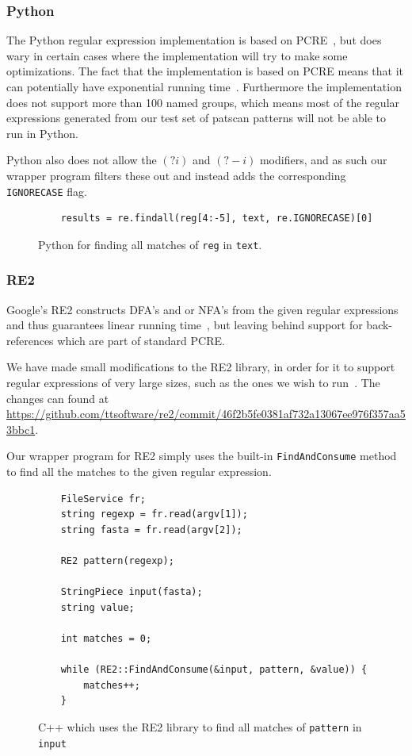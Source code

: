 \documentclass[12pt]{article}
\theoremstyle{definition}
\begin{document}
\subsubsection{Python}

The Python regular expression implementation is based on PCRE~\cite{pcre}, but does wary in certain cases where the implementation will try to make some optimizations. The fact that the implementation is based on PCRE means that it can potentially have exponential running time~\cite{pcre-running-time}. Furthermore the implementation does not support more than 100 named groups, which means most of the regular expressions generated from our test set of patscan patterns will not be able to run in Python.

Python also does not allow the $(?i)$ and $(?-i)$ modifiers, and as such our wrapper program filters these out and instead adds the corresponding \texttt{IGNORECASE} flag.

\begin{figure}[H]
	\begin{lstlisting}
	results = re.findall(reg[4:-5], text, re.IGNORECASE)[0]
	\end{lstlisting}
	\caption{Python for finding all matches of \texttt{reg} in \texttt{text}.}
\end{figure}

\subsubsection{RE2}

Google's RE2 constructs DFA's and or NFA's from the given regular expressions and thus guarantees linear running time~\cite{pcre-running-time}, but leaving behind support for back-references which are part of standard PCRE.

We have made small modifications to the RE2 library, in order for it to support regular expressions of very large sizes, such as the ones we wish to run~\cite{re2}. The changes can found at \small \url{https://github.com/ttsoftware/re2/commit/46f2b5fe0381af732a13067ee976f357aa53bbc1}.\normalsize

Our wrapper program for RE2 simply uses the built-in \texttt{FindAndConsume} method to find all the matches to the given regular expression.

\begin{figure}[H]
	\begin{lstlisting}
	FileService fr;
    string regexp = fr.read(argv[1]);
    string fasta = fr.read(argv[2]);

    RE2 pattern(regexp);

    StringPiece input(fasta);
    string value;
    
    int matches = 0;

    while (RE2::FindAndConsume(&input, pattern, &value)) {
        matches++;
    }
	\end{lstlisting}
	\caption{C++ which uses the RE2 library to find all matches of \texttt{pattern} in \texttt{input}}
\end{figure}
\end{document}
